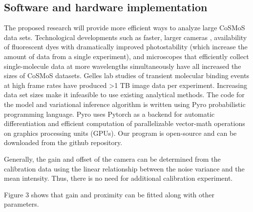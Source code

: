 \subsection*{Software and hardware implementation}

The proposed research will provide more efficient ways to analyze large CoSMoS data sets. Technological developments such as faster, larger cameras \citep{Quan2011-cg}, availability of fluorescent dyes with dramatically improved photostability (which increase the amount of data from a single experiment), and microscopes that efficiently collect single-molecule data at more wavelengths simultaneously \citep{Friedman2006-kb} have all increased the sizes of CoSMoS datasets. Gelles lab studies of transient molecular binding events at high frame rates have produced >1 TB image data per experiment. Increasing data set sizes make it infeasible to use existing analytical methods. The code for the model and variational inference algorithm is written using Pyro probabilistic programming language. Pyro uses Pytorch as a backend for automatic differentiation and efficient computation of parallelizable vector-math operations on graphics processing units (GPUs). Our program is open-source and can be downloaded from the github repository.

Generally, the gain and offset of the camera can be determined from the calibration data using the linear relationship between the noise variance and the mean intensity. Thus, there is no need for additional calibration experiment.

Figure 3 shows that gain and proximity can be fitted along with other parameters.